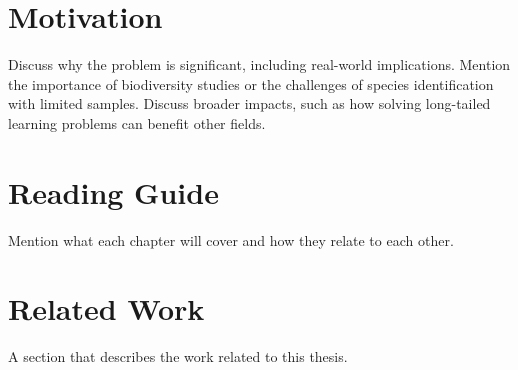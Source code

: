 \section{Motivation}
Discuss why the problem is significant, including real-world implications.
Mention the importance of biodiversity studies or the challenges of species identification with limited samples.
Discuss broader impacts, such as how solving long-tailed learning problems can benefit other fields.


\section{Reading Guide}
Mention what each chapter will cover and how they relate to each other.

\section{Related Work}
A section that describes the work related to this thesis. 
